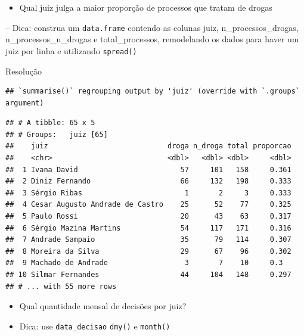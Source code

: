 \documentclass[
  9pt,
  ignorenonframetext,
]{beamer}
\providecommand{\tightlist}{%
  \setlength{\itemsep}{0pt}\setlength{\parskip}{0pt}}
\begin{document}
\begin{frame}[fragile]{}
\protect\hypertarget{section-1}{}
\begin{itemize}
\tightlist
\item
  Qual juiz julga a maior proporção de processos que tratam de drogas
\end{itemize}

-- Dica: construa um \texttt{data.frame} contendo as colunas juiz,
n\_processos\_drogas, n\_processos\_n\_drogas e total\_processos,
remodelando os dados para haver um juiz por linha e utilizando
\texttt{spread()}
\end{frame}

\begin{frame}[fragile]{Resolução}
\protect\hypertarget{resoluuxe7uxe3o}{}
\begin{verbatim}
## `summarise()` regrouping output by 'juiz' (override with `.groups` argument)
\end{verbatim}

\begin{verbatim}
## # A tibble: 65 x 5
## # Groups:   juiz [65]
##    juiz                            droga n_droga total proporcao
##    <chr>                           <dbl>   <dbl> <dbl>     <dbl>
##  1 Ivana David                        57     101   158     0.361
##  2 Diniz Fernando                     66     132   198     0.333
##  3 Sérgio Ribas                        1       2     3     0.333
##  4 Cesar Augusto Andrade de Castro    25      52    77     0.325
##  5 Paulo Rossi                        20      43    63     0.317
##  6 Sérgio Mazina Martins              54     117   171     0.316
##  7 Andrade Sampaio                    35      79   114     0.307
##  8 Moreira da Silva                   29      67    96     0.302
##  9 Machado de Andrade                  3       7    10     0.3  
## 10 Silmar Fernandes                   44     104   148     0.297
## # ... with 55 more rows
\end{verbatim}
\end{frame}

\begin{frame}[fragile]{}
\protect\hypertarget{section-2}{}
\begin{itemize}
\item
  Qual quantidade mensal de decisões por juiz?
\item
  Dica: use \texttt{data\_decisao} \texttt{dmy()} e \texttt{month()}
\end{itemize}
\end{frame}
\end{document}
